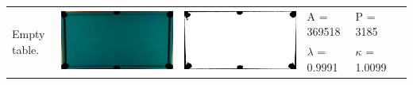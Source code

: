 \begin{tabular}{|l|c|c|l|l|c|}
\multirow{2}{*}{Empty table.} & \multirow{2}{*}{\includegraphics[scale=0.05]{../images/1/0_img.png}} & \multirow{2}{*}{\includegraphics[scale=0.05]{../images/1/0_mask.png}} & A = 369518 & P = 3185 & \multirow{2}{*}{}\\  
& & & $\lambda$ = 0.9991 & $\kappa$ = 1.0099 & \\
\hline


\end{tabular}
